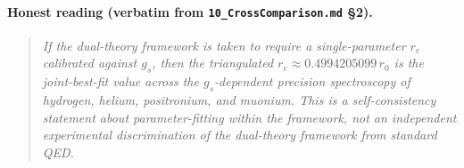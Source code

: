 \paragraph{Honest reading (verbatim from \texttt{10\_CrossComparison.md} \S2).}
\begin{quotation}
\noindent\textit{If the dual-theory framework is taken to require a
single-parameter $r_e$ calibrated against $g_s$, then the triangulated
$r_e \approx 0.4994205099\,r_0$ is the joint-best-fit value across the
$g_s$-dependent precision spectroscopy of hydrogen, helium, positronium,
and muonium. This is a self-consistency statement about parameter-fitting
within the framework, not an independent experimental discrimination of the
dual-theory framework from standard QED.}
\end{quotation}

